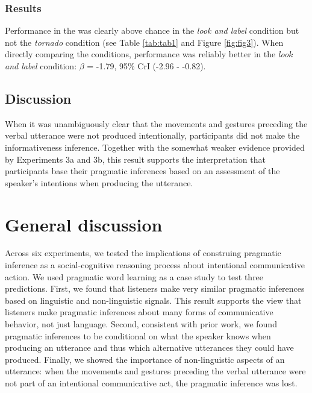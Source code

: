 \documentclass[
  man,floatsintext]{apa6}
\begin{document}
\hypertarget{results-5}{%
\subsubsection{Results}\label{results-5}}

Performance in the was clearly above chance in the \emph{look and label} condition but not the \emph{tornado} condition (see Table \ref{tab:tab1} and Figure \ref{fig:fig3}). When directly comparing the conditions, performance was reliably better in the \emph{look and label} condition: \(\beta\) = -1.79, 95\% CrI (-2.96 - -0.82).

\hypertarget{discussion-5}{%
\subsection{Discussion}\label{discussion-5}}

When it was unambiguously clear that the movements and gestures preceding the verbal utterance were not produced intentionally, participants did not make the informativeness inference. Together with the somewhat weaker evidence provided by Experiments 3a and 3b, this result supports the interpretation that participants base their pragmatic inferences based on an assessment of the speaker's intentions when producing the utterance.

\hypertarget{general-discussion}{%
\section{General discussion}\label{general-discussion}}

Across six experiments, we tested the implications of construing pragmatic inference as a social-cognitive reasoning process about intentional communicative action. We used pragmatic word learning as a case study to test three predictions. First, we found that listeners make very similar pragmatic inferences based on linguistic and non-linguistic signals. This result supports the view that listeners make pragmatic inferences about many forms of communicative behavior, not just language. Second, consistent with prior work, we found pragmatic inferences to be conditional on what the speaker knows when producing an utterance and thus which alternative utterances they could have produced. Finally, we showed the importance of non-linguistic aspects of an utterance: when the movements and gestures preceding the verbal utterance were not part of an intentional communicative act, the pragmatic inference was lost.
\end{document}
